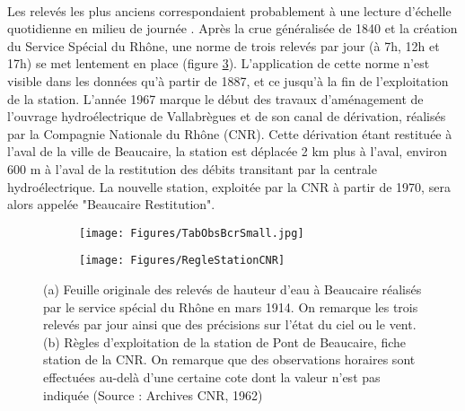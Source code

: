 \documentclass[11pt]{article}
\begin{document}
	\paragraph{} Les relevés les plus anciens correspondaient probablement à une lecture d'échelle quotidienne en milieu de journée \citep{pichard_hauteurs_2013}. Après la crue généralisée de 1840 et la création du Service Spécial du Rhône, une norme de trois relevés par jour (à 7h, 12h et 17h) se met lentement en place (figure \ref{fig:RelevesPt}). L'application de cette norme n'est visible dans les données qu'à partir de 1887, et ce jusqu'à la fin de l'exploitation de la station.  L'année 1967 marque le début des travaux d'aménagement de l'ouvrage hydroélectrique de Vallabrègues et de son canal de dérivation, réalisés par la Compagnie Nationale du Rhône (CNR). Cette dérivation étant restituée à l'aval de la ville de Beaucaire, la station est déplacée 2 km plus à l'aval, environ 600 m à l'aval de la restitution des débits transitant par la centrale hydroélectrique. La nouvelle station, exploitée par la CNR à partir de 1970, sera alors appelée "Beaucaire Restitution".
	
	\begin{figure}[h]
          \centering
            \begin{subfigure}{0.49\linewidth}
            \centering
            	\texttt{[image: Figures/TabObsBcrSmall.jpg]}\hfill
            	\caption{}
            	\label{subfig:TabObsPt}
            \end{subfigure}
            \begin{subfigure}{0.49\linewidth}
            \centering
            	\texttt{[image: Figures/RegleStationCNR]}
            	\caption{}
           		\label{subfig:RegleCNR}
            \end{subfigure}
      \caption{(a) Feuille originale des relevés de hauteur d'eau à Beaucaire réalisés par le service spécial du Rhône en mars 1914. On remarque les trois relevés par jour ainsi que des précisions sur l'état du ciel ou le vent. (b) Règles d'exploitation de la station de Pont de Beaucaire, fiche station de la CNR. On remarque que des observations horaires sont effectuées au-delà d'une certaine cote dont la valeur n'est pas indiquée (Source : Archives CNR, 1962)}
	 \label{fig:RelevesPt}
		
	\end{figure}            
            
\end{document}
